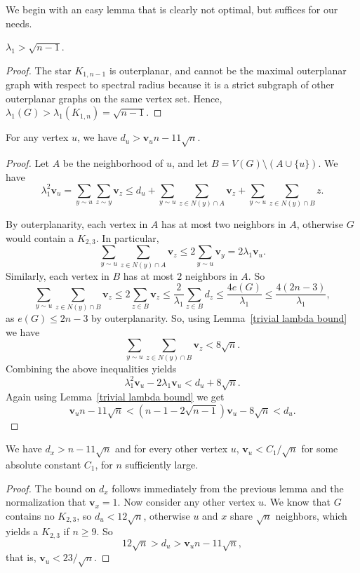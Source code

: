 We begin with an easy lemma that is clearly not optimal, but suffices for our needs.
\begin{lemma}\label{trivial lambda bound}
 $\lambda_1 > \sqrt{n-1}$.
\end{lemma}
\begin{proof}
 The star $K_{1,n-1}$ is outerplanar, and cannot be the maximal outerplanar
 graph with respect to spectral radius because it is a strict subgraph of other outerplanar graphs on the same vertex set.  Hence, $\lambda_1(G) > \lambda_1(K_{1,n}) = \sqrt{n-1}$.
\end{proof}

\begin{lemma}
 For any vertex $u$, we have $d_u > \mathbf{v}_un - 11\sqrt{n}$.
\end{lemma}
\begin{proof}
 Let $A$ be the neighborhood of $u$, and let $B = V(G) \setminus (A\cup \{u\})$.  We have 
  \[ \lambda_1^2 \mathbf{v}_u = \sum_{y \sim u} \sum_{z \sim y} \mathbf{v}_z \leq d_u + \sum_{y \sim u} \sum_{z \in N(y)\cap A} \mathbf{v}_z + \sum_{y \sim u} \sum_{z \in N(y)\cap B} z. \]

\noindent By outerplanarity, each vertex in $A$ has at most two neighbors in $A$, otherwise
$G$ would contain a $K_{2,3}$.  In particular,
 \[ \sum_{y \sim u} \sum_{z \in N(y)\cap A} \mathbf{v}_z  \leq 2 \sum_{y \sim u} \mathbf{v}_y = 2\lambda_1 \mathbf{v}_u. \]
Similarly, each vertex in $B$ has at most $2$ neighbors in $A$.  So
 \[ \sum_{y \sim u} \sum_{z \in N(y)\cap B} \mathbf{v}_z \leq 2 \sum_{z \in B} \mathbf{v}_z \leq \frac{2}{\lambda_1} \sum_{z \in B} d_z \leq \frac{4e(G)}{\lambda_1} \leq \frac{4(2n-3)}{\lambda_1}, \]
as  $e(G) \leq 2n-3$ by outerplanarity.  So, using Lemma~\ref{trivial lambda bound} we have
 \[ \sum_{y \sim u} \sum_{z \in N(y)\cap B} \mathbf{v}_z < 8 \sqrt{n}.\]
Combining the above inequalities yields
 \[ \lambda_1^2 \mathbf{v}_u - 2\lambda_1 \mathbf{v}_u < d_u + 8 \sqrt{n}.\]
Again using Lemma~\ref{trivial lambda bound} we get
 \[ \mathbf{v}_u n - 11\sqrt{n} <  (n-1 - 2\sqrt{n-1}) \mathbf{v}_u - 8 \sqrt{n} < d_u .\]
\end{proof}

\begin{lemma}\label{small eigvec}
 We have $d_x > n - 11 \sqrt{n}$ and for every other vertex $u$, $\mathbf{v}_u < C_1 / \sqrt{n}$ for some absolute constant $C_1$, for $n$ sufficiently large.
\end{lemma}
\begin{proof}
The bound on $d_x$ follows immediately from the previous lemma and the normalization that
$\mathbf{v}_x=1$.  Now consider any other vertex $u$.  We know that $G$ contains no $K_{2,3}$, so $d_u < 12 \sqrt{n}$, otherwise $u$ and $x$ share $\sqrt{n}$ neighbors, which
yields a $K_{2,3}$ if $n \geq 9$.  So
 \[ 12 \sqrt{n} > d_u > \mathbf{v}_u n - 11\sqrt{n}, \]
that is, $\mathbf{v}_u < 23 / \sqrt{n}$.
\end{proof}

